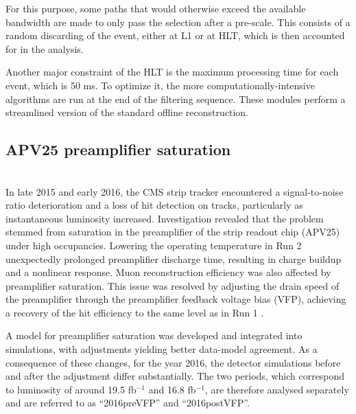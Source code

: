 For this purpose, some paths that would otherwise exceed the available bandwidth are made to only pass the selection after a pre-scale.
This consists of a random discarding of the event, either at L1 or at HLT, which is then accounted for in the analysis.

Another major constraint of the HLT is the maximum processing time for each event, which is 50 ms.
To optimize it, the more computationally-intensive algorithms are run at the end of the filtering sequence.
These modules perform a streamlined version of the standard offline reconstruction.

\begin{subappendices}
\section{APV25 preamplifier saturation}
\\
In late 2015 and early 2016, the CMS strip tracker encountered a signal-to-noise ratio deterioration and a loss of hit detection on tracks, particularly as instantaneous luminosity increased.
Investigation revealed that the problem stemmed from saturation in the preamplifier of the strip readout chip (APV25) under high occupancies.
Lowering the operating temperature in Run 2 unexpectedly prolonged preamplifier discharge time, resulting in charge buildup and a nonlinear response.
Muon reconstruction efficiency was also affected by preamplifier saturation.
This issue was resolved by adjusting the drain speed of the preamplifier \cite{Butz:2018dum} through the preamplifier feedback voltage bias (VFP), achieving a recovery of the hit efficiency to the same level as in Run 1 \cite{CMS:2021ime}.

A model for preamplifier saturation was developed and integrated into simulations, with adjustments yielding better data-model agreement.
As a consequence of these changes, for the year 2016, the detector simulations before and after the adjustment differ substantially.
The two periods, which correspond to luminosity of around 19.5 fb$^{-1}$ and 16.8 fb$^{-1}$,
are therefore analysed separately and are referred to as ``2016preVFP'' and ``2016postVFP''.
\end{subappendices}
